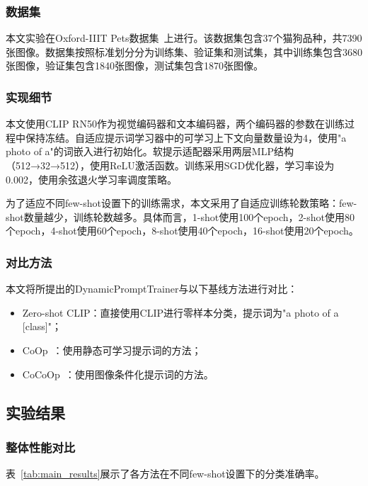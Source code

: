 \documentclass{HDU-Bachelor-Thesis}
\begin{document}
\subsubsection{数据集}

本文实验在Oxford-IIIT Pets数据集~\cite{parkhi2012cats}上进行。该数据集包含37个猫狗品种，共7390张图像。数据集按照标准划分分为训练集、验证集和测试集，其中训练集包含3680张图像，验证集包含1840张图像，测试集包含1870张图像。

\subsubsection{实现细节}

本文使用CLIP RN50作为视觉编码器和文本编码器，两个编码器的参数在训练过程中保持冻结。自适应提示词学习器中的可学习上下文向量数量设为4，使用"a photo of a"的词嵌入进行初始化。软提示适配器采用两层MLP结构（512→32→512），使用ReLU激活函数。训练采用SGD优化器，学习率设为0.002，使用余弦退火学习率调度策略。

为了适应不同few-shot设置下的训练需求，本文采用了自适应训练轮数策略：few-shot数量越少，训练轮数越多。具体而言，1-shot使用100个epoch，2-shot使用80个epoch，4-shot使用60个epoch，8-shot使用40个epoch，16-shot使用20个epoch。

\subsubsection{对比方法}

本文将所提出的DynamicPromptTrainer与以下基线方法进行对比：

\begin{itemize}
\item Zero-shot CLIP：直接使用CLIP进行零样本分类，提示词为"a photo of a [class]"；
\item CoOp~\cite{coop2022}：使用静态可学习提示词的方法；
\item CoCoOp~\cite{cocoop2022}：使用图像条件化提示词的方法。
\end{itemize}

\subsection{实验结果}

\subsubsection{整体性能对比}

表~\ref{tab:main_results}展示了各方法在不同few-shot设置下的分类准确率。
\end{document}
